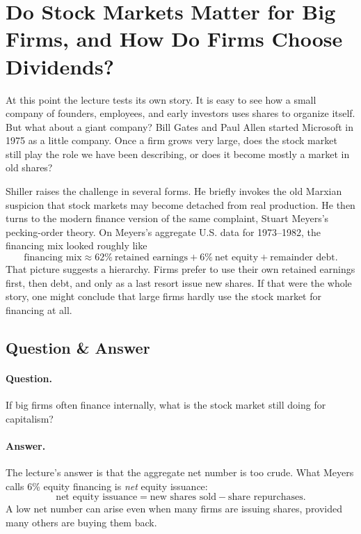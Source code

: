 \section{Do Stock Markets Matter for Big Firms, and How Do Firms Choose Dividends?}

At this point the lecture tests its own story. It is easy to see how a small company of founders, employees, and early investors uses shares to organize itself. But what about a giant company? Bill Gates and Paul Allen started Microsoft in 1975 as a little company. Once a firm grows very large, does the stock market still play the role we have been describing, or does it become mostly a market in old shares?

Shiller raises the challenge in several forms. He briefly invokes the old Marxian suspicion that stock markets may become detached from real production. He then turns to the modern finance version of the same complaint, Stuart Meyers's pecking-order theory. On Meyers's aggregate U.S. data for 1973--1982, the financing mix looked roughly like
\begin{equation}
\text{financing mix} \approx 62\%\ \text{retained earnings} + 6\%\ \text{net equity} + \text{remainder debt}.
\end{equation}
That picture suggests a hierarchy. Firms prefer to use their own retained earnings first, then debt, and only as a last resort issue new shares. If that were the whole story, one might conclude that large firms hardly use the stock market for financing at all.

\subsection{Question \& Answer}

\paragraph{Question.} If big firms often finance internally, what is the stock market still doing for capitalism?

\paragraph{Answer.} The lecture's answer is that the aggregate net number is too crude. What Meyers calls 6\% equity financing is \emph{net} equity issuance:
\begin{equation}
\text{net equity issuance}
=
\text{new shares sold}
-
\text{share repurchases}.
\end{equation}
A low net number can arise even when many firms are issuing shares, provided many others are buying them back.

